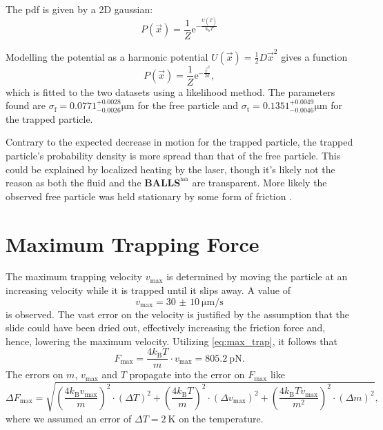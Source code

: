 The pdf is given by a 2D gaussian:
\begin{equation*}
	P(\vec{x}) = \frac{1}{Z} \text{e}^{-\frac{U(\vec{x})}{\text{k}_\text{b} T}}
\end{equation*}

Modelling the potential as a harmonic potential $U(\vec{x}) = \frac{1}{2} D \vec{x}^2$ gives a function
\begin{equation}
	P(\vec{x}) = \frac{1}{Z} \text{e}^{-\frac{\vec{x}^2}{2 \sigma}},
\end{equation}
which is fitted to the two datasets using a likelihood method.
The parameters found are $\sigma_\text{f} = \num{0.0771}^{+0.0028}_{-0.0026}\si{\um}$ for the free particle and $\sigma_\text{t} = \num{0.1351}^{+0.0049}_{-0.0046}\si{\um}$ for the trapped particle.

Contrary to the expected decrease in motion for the trapped particle, the trapped particle's probability density is more spread than that of the free particle.
This could be explained by localized heating by the laser, though it's likely not the reason as both the fluid and the \textbf{BALLS}$^{^\text{hah}}$ are transparent.
More likely the observed free particle was held stationary by some form of friction .

\section{Maximum Trapping Force}
The maximum trapping velocity $v_\text{max}$ is determined by moving the particle at an increasing velocity while it is trapped until it slips away.
A value of
\begin{equation*}
	v_\text{max} = \SI{30(10)}{\micro\meter\per\second}
\end{equation*}
is observed.
The vast error on the velocity is justified by the assumption that the slide could have been dried out, effectively increasing the friction force and, hence, lowering the maximum velocity.
Utilizing \autoref{eq:max_trap}, it follows that
\begin{equation*}
	F_\text{max} = \frac{4k_\text{B}T}{m}\cdot v_\text{max} = \SI{805.2}{\pico\newton}.	%
\end{equation*}
The errors on $m$, $v_\text{max}$ and $T$ propagate into the error on $F_\text{max}$ like
\begin{equation*}
	\Delta F_\text{max} = \sqrt{\left(\frac{4k_\text{B}v_\text{max}}{m}\right)^2\cdot\left(\Delta T\right)^2 + \left(\frac{4k_\text{B}T}{m}\right)^2\cdot\left(\Delta v_\text{max}\right)^2 + \left(\frac{4k_\text{B}Tv_\text{max}}{m^2}\right)^2\cdot\left(\Delta m\right)^2},
\end{equation*}
where we assumed an error of $\Delta T = \SI{2}{\kelvin}$ on the temperature.

